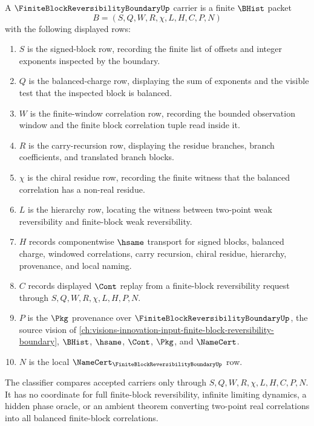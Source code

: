 \begin{definition}
\label{def:finite-block-reversibility-boundary-carrier}
A $\FiniteBlockReversibilityBoundaryUp$ carrier is a finite $\BHist$ packet
$$
B=(S,Q,W,R,\chi,L,H,C,P,N)
$$
with the following displayed rows:
\begin{enumerate}
\item $S$ is the signed-block row, recording the finite list of offsets and integer exponents inspected by the boundary.
\item $Q$ is the balanced-charge row, displaying the sum of exponents and the visible test that the inspected block is balanced.
\item $W$ is the finite-window correlation row, recording the bounded observation window and the finite block correlation tuple read inside it.
\item $R$ is the carry-recursion row, displaying the residue branches, branch coefficients, and translated branch blocks.
\item $\chi$ is the chiral residue row, recording the finite witness that the balanced correlation has a non-real residue.
\item $L$ is the hierarchy row, locating the witness between two-point weak reversibility and finite-block weak reversibility.
\item $H$ records componentwise $\hsame$ transport for signed blocks, balanced charge, windowed correlations, carry recursion, chiral residue, hierarchy, provenance, and local naming.
\item $C$ records displayed $\Cont$ replay from a finite-block reversibility request through $S,Q,W,R,\chi,L,H,P,N$.
\item $P$ is the $\Pkg$ provenance over $\FiniteBlockReversibilityBoundaryUp$, the source vision of \autoref{ch:visions-innovation-input-finite-block-reversibility-boundary}, $\BHist$, $\hsame$, $\Cont$, $\Pkg$, and $\NameCert$.
\item $N$ is the local $\NameCert_{\FiniteBlockReversibilityBoundaryUp}$ row.
\end{enumerate}
The classifier compares accepted carriers only through $S,Q,W,R,\chi,L,H,C,P,N$. It has no coordinate for full finite-block reversibility, infinite limiting dynamics, a hidden phase oracle, or an ambient theorem converting two-point real correlations into all balanced finite-block correlations.
\end{definition}

